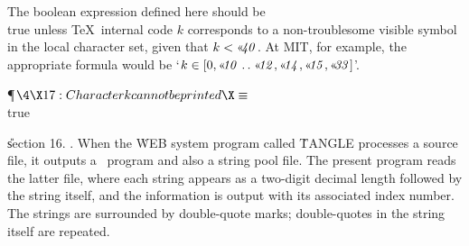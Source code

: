 The boolean expression defined here should be \\{true} unless \TeX\ internal
code
$k$ corresponds to a non-troublesome visible symbol in the local character
set, given that $\|k<\O{40}$.
At MIT, for example, the appropriate formula would be
`$\|k\in[0,\O{10}\to\O{12},\O{14},\O{15},\O{33}]$'.

\Y\P$\4\X17:Character \|k cannot be printed\X\S$\6
\\{true}\par
\U section 16.\fi
{}. When the \.{WEB} system program called \.{TANGLE} processes a source
file,
it outputs a \PASCAL\ program and also a string pool file. The present
program reads the latter file, where each string appears as a two-digit decimal
length followed by the string itself, and the information is output with its
associated index number. The strings are surrounded by double-quote marks;
double-quotes in the string itself are repeated.

